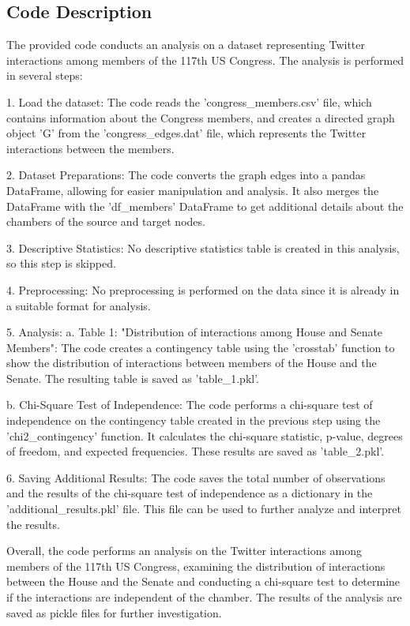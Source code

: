 \documentclass[11pt]{article}
\begin{document}
\subsection{Code Description}

The provided code conducts an analysis on a dataset representing Twitter interactions among members of the 117th US Congress. The analysis is performed in several steps:

1. Load the dataset: The code reads the 'congress\_members.csv' file, which contains information about the Congress members, and creates a directed graph object 'G' from the 'congress\_edges.dat' file, which represents the Twitter interactions between the members.

2. Dataset Preparations: The code converts the graph edges into a pandas DataFrame, allowing for easier manipulation and analysis. It also merges the DataFrame with the 'df\_members' DataFrame to get additional details about the chambers of the source and target nodes.

3. Descriptive Statistics: No descriptive statistics table is created in this analysis, so this step is skipped.

4. Preprocessing: No preprocessing is performed on the data since it is already in a suitable format for analysis.

5. Analysis:
    a. Table 1: "Distribution of interactions among House and Senate Members": The code creates a contingency table using the 'crosstab' function to show the distribution of interactions between members of the House and the Senate. The resulting table is saved as 'table\_1.pkl'.

    b. Chi-Square Test of Independence: The code performs a chi-square test of independence on the contingency table created in the previous step using the 'chi2\_contingency' function. It calculates the chi-square statistic, p-value, degrees of freedom, and expected frequencies. These results are saved as 'table\_2.pkl'.

6. Saving Additional Results: The code saves the total number of observations and the results of the chi-square test of independence as a dictionary in the 'additional\_results.pkl' file. This file can be used to further analyze and interpret the results.

Overall, the code performs an analysis on the Twitter interactions among members of the 117th US Congress, examining the distribution of interactions between the House and the Senate and conducting a chi-square test to determine if the interactions are independent of the chamber. The results of the analysis are saved as pickle files for further investigation.
\end{document}
